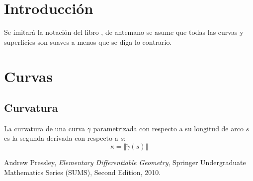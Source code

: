 \documentclass{article}
\renewcommand{\v}{\Vert}
\begin{document}
\section{Introducción}
Se imitará la notación del libro \cite{edg}, de antemano se asume que todas las curvas y superficies son suaves a menos que se diga lo contrario.

\section{Curvas}
\subsection{Curvatura}
La curvatura de una curva $\gamma$ parametrizada con respecto a su longitud de arco $s$ es la segunda derivada con respecto a $s$:
$$\kappa = \v \ddot \gamma(s)\v$$

\begin{thebibliography}{9}
Andrew Pressley,
\emph{Elementary Differentiable Geometry},
Springer Undergraduate Mathematics Series (SUMS),
Second Edition, 
2010.
\end{thebibliography}
\end{document}
